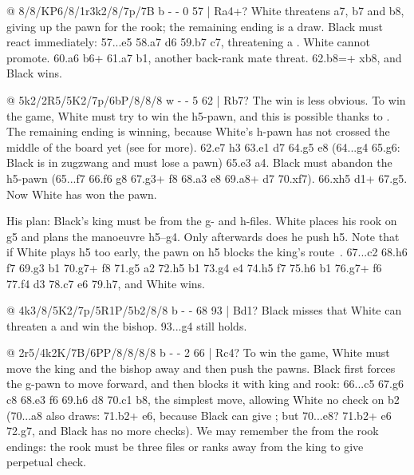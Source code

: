 @ 8/8/KP6/8/1r3k2/8/7p/7B b - - 0 57 | Ra4+?
White threatens \K a7, b7 and b8, giving up the pawn for the rook; the remaining ending is a draw.
Black must react immediately: 57...\K e5 58.\K a7 \K d6 59.b7 \K c7, threatening a
. White cannot promote. 60.\K a6 \R b6+ 61.\K a7
\R b1, another back-rank mate threat. 62.b8=\Q+ \R xb8, and Black wins.

@ 5k2/2R5/5K2/7p/6bP/8/8/8 w - - 5 62 | Rb7?
The win is less obvious. To win the game, White must try to win the h5-pawn, and this is possible
thanks to . The remaining ending is winning, because White's
h-pawn has not crossed the middle of the board yet (see \cite{Dvoretsky:2008-endgame-manual} for
more). 62.\R e7 \B h3 63.\R e1 \B d7 64.\K g5 \B e8 (64...\B g4 65.\K g6: Black is in zugzwang and
must lose a pawn) 65.\R e3 \B a4. Black must abandon the h5-pawn (65...\B f7 66.\K f6 \K g8
67.\R g3+ \K f8 68.\R a3 \K e8 69.\R a8+ \K d7 70.\K xf7). 66.\K xh5 \B d1+ 67.\K g5. Now White has
won the pawn.

His plan: Black's king must be  from the
g- and h-files. White places his rook on g5 and plans the manoeuvre \K h5--g4. Only afterwards does
he push h5. Note that if White plays h5 too early, the pawn on h5 blocks the king's
route~\cite{Dvoretsky:2008-endgame-manual}. 67...\B c2 68.\K h6 \K f7 69.\R g3 \B b1 70.\R g7+
\K f8 71.\R g5 \B a2 72.\K h5 \B b1 73.\K g4 \B e4 74.h5 \K f7 75.h6 \B b1 76.\R g7+ \K f6
77.\K f4 \B d3 78.\R c7 \K e6 79.h7, and White wins.

@ 4k3/8/5K2/7p/5R1P/5b2/8/8 b - - 68 93 | Bd1?
Black misses that White can threaten a  and
win the bishop. 93...\B g4 still holds.

@ 2r5/4k2K/7B/6PP/8/8/8/8 b - - 2 66 | Rc4?
To win the game, White must move the king and the bishop away and then push the pawns. Black first
forces the g-pawn to move forward, and then blocks it with king and rook: 66...\R c5 67.g6 \R c8
68.\B e3 \K f6 69.h6 \R d8 70.\B c1 \R b8, the simplest move, allowing White no check on b2
(70...\R a8 also draws: 71.\B b2+ \K e6, because Black can give ;
but 70...\R e8? 71.\B b2+ \K e6 72.\K g7, and Black has no more checks). We may remember the
 from the rook endings: the rook must be three
files or ranks away from the king to give perpetual check.


